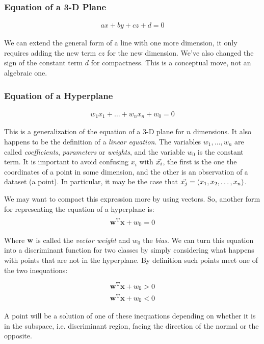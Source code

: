 \subsubsection*{Equation of a 3-D Plane}
\begin{align}
    ax + by + cz + d = 0
\end{align}

We can extend the general form of a line with one more dimension, it only requires adding the new term $cz$ for the new dimension. We've also changed the sign of the constant term $d$ for compactness. This is a conceptual move, not an algebraic one.

\subsubsection*{Equation of a Hyperplane}
\begin{align}
    w_1x_1 + \dots + w_nx_n + w_0 = 0
\end{align}

This is a generalization of the equation of a 3-D plane for $n$ dimensions. It also happens to be the definition of a \emph{linear equation}. The variables $w_1, \dots, w_n$ are called \emph{coefficients}, \emph{parameters} or \emph{weights}, and the variable $w_0$ is the constant term. It is important to avoid confusing $x_i$ with $\vec{x_i}$, the first is the one the coordinates of a point in some dimension, and the other is an observation of a dataset (a point). In particular, it may be the case that $\vec{x_j} = (x_1, x_2, \dots, x_n)$.

We may want to compact this expression more by using vectors. So, another form for representing the equation of a hyperplane is:
\begin{align}
    \mathbf{w}^{\text{T}}\mathbf{x} + w_0 = 0
\end{align}

Where $\mathbf{w}$ is called the \emph{vector weight} and $w_0$ the \emph{bias}. We can turn this equation into a discriminant function for two classes by simply considering what happens with points that are not in the hyperplane. By definition such points meet one of the two inequations:

\begin{align*}
    \mathbf{w}^{\text{T}}\mathbf{x} + w_0 > 0 \\
    \mathbf{w}^{\text{T}}\mathbf{x} + w_0 < 0
\end{align*}

A point will be a solution of one of these inequations depending on whether it is in the subspace, i.e. discriminant region, facing the direction of the normal or the opposite.

